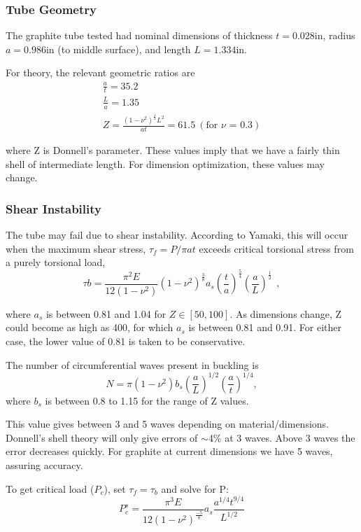 \documentclass{report}
\begin{document}
\begin{multicols}{2}
\subsubsection{Tube Geometry}
The graphite tube tested had nominal dimensions of thickness $t = 0.028$in, radius $a = 0.986$in (to middle surface), and length $L=1.334$in.

For theory, the relevant geometric ratios are
\begin{eqnarray}
\frac{a}{t} = 35.2 \\
\frac{L}{a} = 1.35 \\
Z = \frac{(1-\nu^2)^\frac{1}{2}L^2}{at} = 61.5 \ (\text{for $\nu$ = 0.3})
\end{eqnarray}

where Z is Donnell's parameter. These values imply that we have a fairly thin shell of intermediate length. For dimension optimization, these values may change.

\subsubsection{Shear Instability}

The tube may fail due to shear instability. According to Yamaki, this will occur when the maximum shear stress, $\tau_{f} = P/\pi at$ exceeds critical torsional stress from a purely torsional load,
$$
\tau{b} = \frac{\pi^2E}{12(1-\nu^2)}(1-\nu^2)^{\frac{3}{8}}a_s\left(\frac{t}{a}\right)^{\frac{5}{4}}\left(\frac{a}{L}\right)^{\frac{1}{2}}~~,
$$

where $a_{s}$ is between 0.81 and 1.04 for $Z \in [50,100]$. As dimensions change, Z could become as high as 400, for which $a_{s}$ is between 0.81 and 0.91. For either case, the lower value of 0.81 is taken to be conservative.

The number of circumferential waves present in buckling is
$$
N = \pi(1-\nu^2)b_{s}\left(\frac{a}{L}\right)^{1/2}\left(\frac{a}{t}\right)^{1/4},
$$
where $b_{s}$ is between 0.8 to 1.15 for the range of Z values.

This value gives between 3 and 5 waves depending on material/dimensions. Donnell's shell theory will only give errors of $\sim$4\% at 3 waves. Above 3 waves the error decreases
quickly. For graphite at current dimensions we have 5 waves, assuring accuracy.

To get critical load ($P_{c}$), set $\tau_{f} = \tau_{b}$ and solve for P:
$$
P_{c}^{s} = \frac{\pi^3E}{12(1-\nu^2)^{\frac{-5}{8}}}a_{s}\frac{a^{1/4}t^{9/4}}{L^{1/2}}
$$


\end{multicols}
\end{document}
